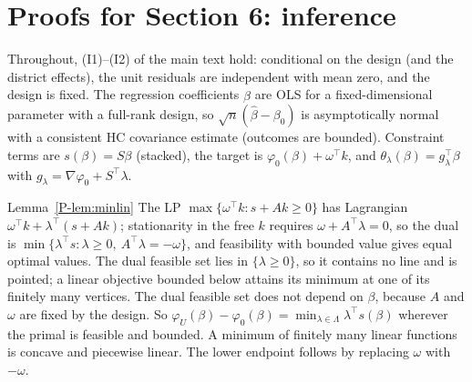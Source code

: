 \section{Proofs for Section 6: inference}\label{sec:proofs-inference}

Throughout, (I1)--(I2) of the main text hold: conditional on the design (and the
district effects), the unit residuals are independent with mean zero, and the design
is fixed. The regression coefficients $\hat\beta$ are OLS for a fixed-dimensional
parameter with a full-rank design, so $\sqrt n(\hat\beta-\beta_0)$ is asymptotically
normal with a consistent HC covariance estimate (outcomes are bounded). Constraint terms
are $s(\beta)=S\beta$ (stacked), the target is $\varphi_0(\beta)+\omega^\top k$, and
$\theta_\lambda(\beta)=g_\lambda^\top\beta$ with $g_\lambda=\nabla\varphi_0+S^\top\lambda$.

\begin{proofof}{Lemma~\ref{P-lem:minlin}}
The LP $\max\{\omega^\top k:s+Ak\ge0\}$ has Lagrangian $\omega^\top k+\lambda^\top(s+Ak)$;
stationarity in the free $k$ requires $\omega+A^\top\lambda=0$, so the dual is
$\min\{\lambda^\top s:\lambda\ge0,\ A^\top\lambda=-\omega\}$, and feasibility with bounded
value gives equal optimal values. The dual feasible set lies in $\{\lambda\ge0\}$, so it
contains no line and is pointed; a linear objective bounded below attains its minimum
at one of its finitely many vertices. The dual feasible set does not depend on $\beta$,
because $A$ and $\omega$ are fixed by the design. So
$\varphi_U(\beta)-\varphi_0(\beta)=\min_{\lambda\in\Lambda}\lambda^\top s(\beta)$ wherever
the primal is feasible and bounded. A minimum of finitely many linear functions is
concave and piecewise linear. The lower endpoint follows by replacing $\omega$ with
$-\omega$.
\end{proofof}


